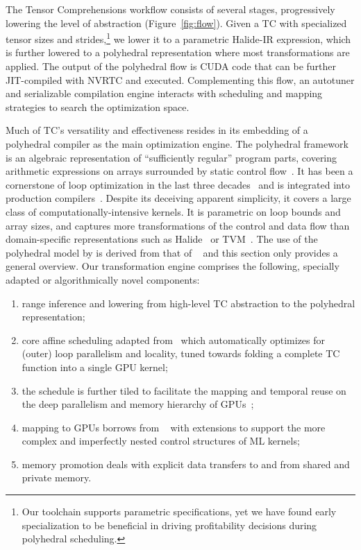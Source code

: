 The Tensor Comprehensions workflow consists of several stages, progressively
lowering the level of abstraction (Figure~\ref{fig:flow}).
Given a TC with specialized tensor sizes and strides,\footnote{Our
  toolchain supports parametric specifications, yet we have found
  early specialization to be beneficial in driving profitability
  decisions during polyhedral scheduling.} we lower it to a parametric
Halide-IR expression, which is further lowered to a polyhedral
representation where most transformations are applied.  The output of the
polyhedral flow is CUDA code that can be further JIT-compiled with NVRTC and
executed.  Complementing this flow, an autotuner and serializable compilation
engine interacts with scheduling and mapping strategies to search the
optimization space.

Much of TC's versatility and effectiveness resides in its embedding of a
polyhedral compiler as the main optimization engine. The polyhedral framework
is an algebraic representation of ``sufficiently regular'' program parts,
covering arithmetic expressions on arrays surrounded by static control
flow~\cite{Feautrier2011Polyhedron}.  It has been a cornerstone of loop
optimization in the last three
decades~\cite{Irigoin1988Supernode,feautrier92multi,Ancourt1991Scanning,Bastoul2004CLooG,Bondhugula2008Pluto,PPCG2013}
and is integrated into production
compilers~\cite{Trifunovic2010graphite,RStream,Grosser2012Polly,IBMXL}.
Despite its deceiving apparent simplicity, it covers a large class of
computationally-intensive kernels. It is parametric on loop bounds and array
sizes, and captures more transformations of the control and data flow
than domain-specific representations such as
Halide~\cite{Halide} or TVM~\cite{TVM}.  The use of the polyhedral model by
\ourtoolkitname is derived from that of \ppcg~\cite{PPCG2013} and this section
only provides a general overview.
Our transformation engine comprises the following, specially adapted or
algorithmically novel components:
\begin{enumerate}
\item range inference and lowering from high-level TC abstraction to the
  polyhedral representation;
\item core affine scheduling adapted from \isl\ which
  automatically optimizes for (outer) loop parallelism and locality, 
  tuned towards folding a complete TC function into a single GPU kernel;
\item the schedule is further tiled to facilitate the mapping and
  temporal reuse on the deep parallelism and memory hierarchy of
  GPUs~\cite{Verdoolaege2017scheduler};
\item mapping to GPUs borrows from \ppcg~\cite{PPCG2013} with
  extensions to support the more complex and imperfectly
  nested control structures of ML kernels;
\item memory promotion deals with explicit data transfers to and from
  shared and private memory.
\end{enumerate}

